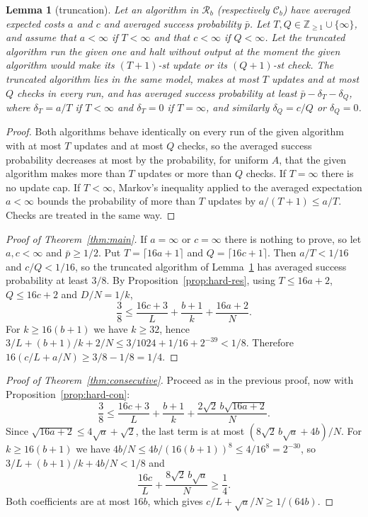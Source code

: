 \documentclass{amsart}
\theoremstyle{plain}
\newtheorem{lemma}[theorem]{Lemma}
\theoremstyle{definition}
\theoremstyle{remark}
\newcommand{\Z}{\mathbb{Z}}
\newcommand{\res}{\mathcal{R}}
\newcommand{\con}{\mathcal{C}}
\begin{document}
\begin{lemma}[truncation]\label{lem:truncation}
Let an algorithm in $\res_b$ (respectively $\con_b$) have averaged expected costs $a$ and $c$ and averaged success probability $\bar p$. Let $T,Q\in\Z_{\ge1}\cup\{\infty\}$, and assume that $a<\infty$ if $T<\infty$ and that $c<\infty$ if $Q<\infty$. Let the truncated algorithm run the given one and halt without output at the moment the given algorithm would make its $(T+1)$-st update or its $(Q+1)$-st check. The truncated algorithm lies in the same model, makes at most $T$ updates and at most $Q$ checks in every run, and has averaged success probability at least $\bar p-\delta_T-\delta_Q$, where $\delta_T=a/T$ if $T<\infty$ and $\delta_T=0$ if $T=\infty$, and similarly $\delta_Q=c/Q$ or $\delta_Q=0$.
\end{lemma}

\begin{proof}
Both algorithms behave identically on every run of the given algorithm with at most $T$ updates and at most $Q$ checks, so the averaged success probability decreases at most by the probability, for uniform $A$, that the given algorithm makes more than $T$ updates or more than $Q$ checks. If $T=\infty$ there is no update cap. If $T<\infty$, Markov's inequality applied to the averaged expectation $a<\infty$ bounds the probability of more than $T$ updates by $a/(T+1)\le a/T$. Checks are treated in the same way.
\end{proof}

\begin{proof}[Proof of Theorem~\ref{thm:main}]
If $a=\infty$ or $c=\infty$ there is nothing to prove, so let $a,c<\infty$ and $\bar p\ge 1/2$. Put $T=\lceil 16a+1\rceil$ and $Q=\lceil 16c+1\rceil$. Then $a/T<1/16$ and $c/Q<1/16$, so the truncated algorithm of Lemma~\ref{lem:truncation} has averaged success probability at least $3/8$. By Proposition~\ref{prop:hard-res}, using $T\le 16a+2$, $Q\le 16c+2$ and $D/N=1/k$,
\[
\frac38\le\frac{16c+3}{L}+\frac{b+1}{k}+\frac{16a+2}{N}.
\]
For $k\ge 16(b+1)$ we have $k\ge 32$, hence $3/L+(b+1)/k+2/N\le 3/1024+1/16+2^{-39}<1/8$. Therefore $16(c/L+a/N)\ge 3/8-1/8=1/4$.
\end{proof}

\begin{proof}[Proof of Theorem~\ref{thm:consecutive}]
Proceed as in the previous proof, now with Proposition~\ref{prop:hard-con}:
\[
\frac38\le\frac{16c+3}{L}+\frac{b+1}{k}+\frac{2\sqrt2\,b\sqrt{16a+2}}{N}.
\]
Since $\sqrt{16a+2}\le 4\sqrt a+\sqrt2$, the last term is at most $(8\sqrt2\,b\sqrt a+4b)/N$. For $k\ge 16(b+1)$ we have $4b/N\le 4b/(16(b+1))^8\le 4/16^8=2^{-30}$, so $3/L+(b+1)/k+4b/N<1/8$ and
\[
\frac{16c}{L}+\frac{8\sqrt2\,b\sqrt a}{N}\ge\frac14 .
\]
Both coefficients are at most $16b$, which gives $c/L+\sqrt a/N\ge 1/(64b)$.
\end{proof}
\end{document}
